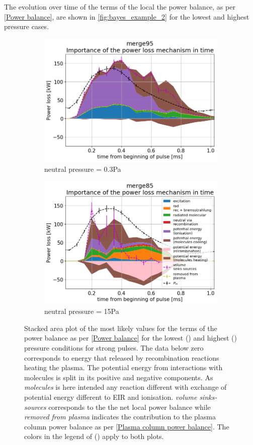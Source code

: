 The evolution over time of the terms of the local the power balance, as per \autoref{Power balance}, are shown in \autoref{fig:bayes_example_2} for the lowest and highest pressure cases.
\begin{figure}[!ht]
	\centering
     \begin{subfigure}{1\linewidth}
        \centering
    	\includegraphics[width=0.7\linewidth,trim={5 0 5 45},clip]{Chapters/chapter3/figs/_merge95_global_fit_example44.png}
         \caption{neutral pressure = 0.3Pa}
        \label{fig:bayes_example_2a}
    \end{subfigure}
    \hfill
    \begin{subfigure}{1\linewidth}
        \centering
        \includegraphics[width=0.7\linewidth,trim={5 0 5 45},clip]{Chapters/chapter3/figs/_merge85_global_fit_example7.png}
         \caption{neutral pressure = 15Pa}
        \label{fig:bayes_example_2b}
    \end{subfigure}
	\caption{Stacked area plot of the most likely values for the terms of the power balance as per \autoref{Power balance} for the lowest () and highest () pressure conditions for strong pulses. The data below zero corresponds to energy that released by recombination reactions heating the plasma. The potential energy from interactions with molecules is split in its positive and negative components. As \emph{molecules} is here intended any reaction different with exchange of potential energy different to EIR and ionisation. \emph{volume sinks-sources} corresponds to the the net local power balance while \emph{removed from plasma} indicates the contribution to the plasma column power balance as per \autoref{Plasma column power balance}. The colors in the legend of () apply to both plots.}
    \label{fig:bayes_example_2}
\end{figure}
